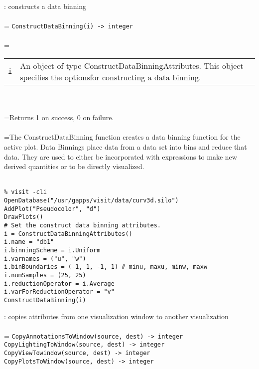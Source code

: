 \documentclass[10pt,a4paper]{report}
\begin{document}
{}
: constructs a data binning\\[-3mm]

 \\ 
\hangindent=\parindent 
\verb!ConstructDataBinning(i) -> integer!\\ [-3mm]

 \\ 
\hangindent=\parindent 
\begin{tabular}{lp{9cm}}
\verb!i! & An object of type ConstructDataBinningAttributes.  This object specifies the optionsfor constructing a data binning. \\
\end{tabular} \\[-2mm]


 \\ 
\hangindent=\parindent Returns 1 on success, 0 on failure. \\[-3mm] 

 \\ 
\hangindent=\parindent The ConstructDataBinning function creates a data binning function for the active  plot.  Data Binnings place data from a data set into bins and reduce that data.   They are used to either be incorporated with expressions to make new derived quantities  or to be directly visualized. \\[-3mm] 

\\[-6mm]
\begin{verbatim}% visit -cli
OpenDatabase("/usr/gapps/visit/data/curv3d.silo")
AddPlot("Pseudocolor", "d")
DrawPlots()
# Set the construct data binning attributes.
i = ConstructDataBinningAttributes()
i.name = "db1"
i.binningScheme = i.Uniform
i.varnames = ("u", "w")
i.binBoundaries = (-1, 1, -1, 1) # minu, maxu, minw, maxw
i.numSamples = (25, 25)
i.reductionOperator = i.Average
i.varForReductionOperator = "v"
ConstructDataBinning(i)
\end{verbatim}
\newpage


{}
: copies attributes from one visualization window to another visualization\\[-3mm]

 \\ 
\hangindent=\parindent 
\verb!CopyAnnotationsToWindow(source, dest) -> integer!\\ 
\verb!CopyLightingToWindow(source, dest) -> integer!\\ 
\verb!CopyViewTowindow(source, dest) -> integer!\\ 
\verb!CopyPlotsToWindow(source, dest) -> integer!\\ [-3mm]
\end{document}
